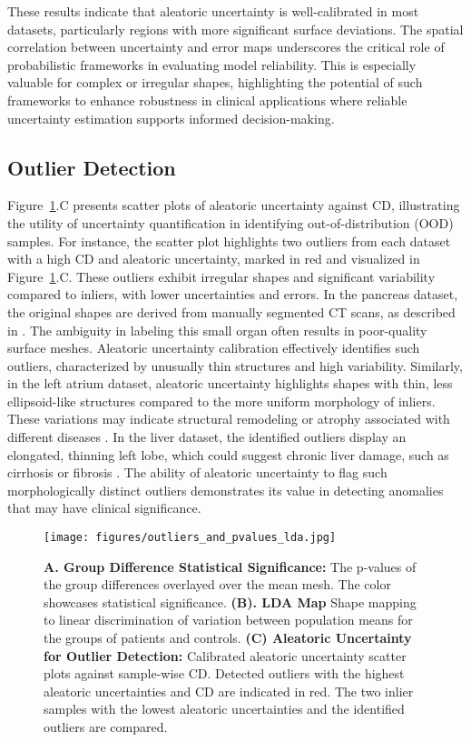 These results indicate that aleatoric uncertainty is well-calibrated in most datasets, particularly regions with more significant surface deviations. The spatial correlation between uncertainty and error maps underscores the critical role of probabilistic frameworks in evaluating model reliability. This is especially valuable for complex or irregular shapes, highlighting the potential of such frameworks to enhance robustness in clinical applications where reliable uncertainty estimation supports informed decision-making.


\subsection{Outlier Detection}
Figure~\ref{fig:lda_outliers}.C presents scatter plots of aleatoric uncertainty against CD, illustrating the utility of uncertainty quantification in identifying out-of-distribution (OOD) samples. For instance, the scatter plot highlights two outliers from each dataset with a high CD and aleatoric uncertainty, marked in red and visualized in Figure~\ref{fig:lda_outliers}.C. These outliers exhibit irregular shapes and significant variability compared to inliers, with lower uncertainties and errors.
In the pancreas dataset, the original shapes are derived from manually segmented CT scans, as described in \cite{simpson2019large}. The ambiguity in labeling this small organ often results in poor-quality surface meshes. Aleatoric uncertainty calibration effectively identifies such outliers, characterized by unusually thin structures and high variability. Similarly, in the left atrium dataset, aleatoric uncertainty highlights shapes with thin, less ellipsoid-like structures compared to the more uniform morphology of inliers. These variations may indicate structural remodeling or atrophy associated with different diseases \cite{casaclang2008structural}. In the liver dataset, the identified outliers display an elongated, thinning left lobe, which could suggest chronic liver damage, such as cirrhosis or fibrosis \cite{higaki2023liver}. The ability of aleatoric uncertainty to flag such morphologically distinct outliers demonstrates its value in detecting anomalies that may have clinical significance.

\begin{figure}
    \centering
    \texttt{[image: figures/outliers\_and\_pvalues\_lda.jpg]}
    \caption{\textbf{A. Group Difference Statistical Significance:} The p-values of the group differences overlayed over the mean mesh. The color showcases statistical significance. \textbf{(B). LDA Map} Shape mapping to linear discrimination of variation between population means for the groups of patients and controls. \textbf{(C) Aleatoric Uncertainty for Outlier Detection: }Calibrated aleatoric uncertainty scatter plots against sample-wise CD. Detected outliers with the highest aleatoric uncertainties and CD are indicated in red. The two inlier samples with the lowest aleatoric uncertainties and the identified outliers are compared. }  
    \label{fig:lda_outliers}
\end{figure}

